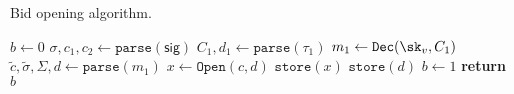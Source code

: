 \begin{algorithm}
    \caption{Bid opening algorithm.}
    \label{alg:bidop}
    \begin{algorithmic}[1]
        \State $b \gets 0$
        \State $\sigma, c_1, c_2 \gets \mathtt{parse}(\mathsf{sig})$
            \State $C_1, d_1 \gets \mathtt{parse}(\tau_1)$  
                \State $m_1 \gets \mathtt{Dec}(\sk_v, C_1)$
                \State $\tilde{c}, \tilde{\sigma}, \Sigma, d \gets \mathtt{parse}(m_1)$
                        \State $x \gets \mathtt{Open}(c, d)$
                        \State $\mathtt{store}(x)$
                        \State $\mathtt{store}(d)$
                        \State $b \gets 1$
                    \EndIf
                \EndIf
            \EndIf
        \EndIf
        \State \textbf{return} $b$
        \EndFunction
    \end{algorithmic}
\end{algorithm}